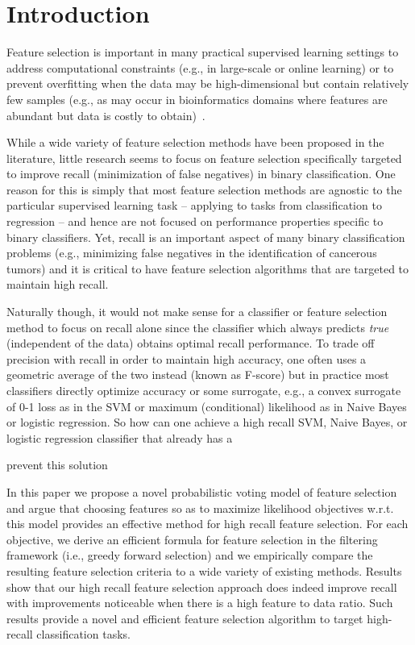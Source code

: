 \section{Introduction}

Feature selection is important in many practical supervised learning
settings to address computational constraints (e.g., in large-scale or
online learning) or to prevent overfitting when the data may be
high-dimensional but contain relatively few samples (e.g., as may
occur in bioinformatics domains where features are abundant but data
is costly to obtain)~\cite{guyon_jmlr03}.

While a wide variety of feature selection methods have been proposed
in the literature, little research seems to focus on feature selection
specifically targeted to improve recall (minimization of false
negatives) in binary classification.  One reason for this is simply
that most feature selection methods are agnostic to the particular
supervised learning task -- applying to tasks from classification to
regression -- and hence are not focused on performance properties
specific to binary classifiers.  Yet, recall is an important aspect of
many binary classification problems (e.g., minimizing false negatives
in the identification of cancerous tumors) and it is critical to have
feature selection algorithms that are targeted to maintain high recall.

Naturally though, it would not make sense for a classifier or feature
selection method to focus on recall alone since the classifier which
always predicts \emph{true} (independent of the data) obtains optimal
recall performance.  To trade off precision with recall in order to
maintain high accuracy, one often uses a geometric average of the
two instead (known as F-score) but in practice most classifiers directly
optimize accuracy or some surrogate, e.g., a convex surrogate of 0-1
loss as in the SVM or maximum (conditional) likelihood as in Naive
Bayes or logistic regression.  So how can one achieve a high recall
SVM, Naive Bayes, or logistic regression classifier that already has
a 


prevent this solution


In this paper we propose a novel probabilistic voting model of feature
selection and argue that choosing features so as to maximize
likelihood objectives w.r.t. this model provides an effective method
for high recall feature selection.  For each objective, we derive an
efficient formula for feature selection in the filtering framework
(i.e., greedy forward selection) and we empirically compare the
resulting feature selection criteria to a wide variety of existing
methods.  Results show that our high recall feature selection approach
does indeed improve recall with improvements noticeable when there is
a high feature to data ratio.  Such results provide a novel and
efficient feature selection algorithm to target high-recall
classification tasks.



